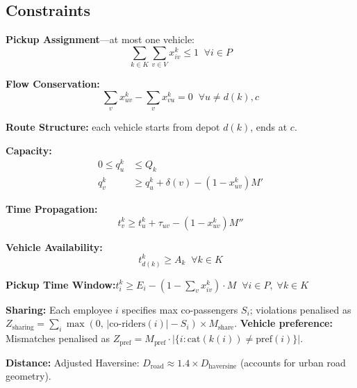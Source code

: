 \documentclass[11pt,a4paper]{article}
\begin{document}
\subsection{Constraints}

\begin{minipage}[t]{0.48\textwidth}
\textbf{Pickup Assignment}---at most one vehicle:
\begin{equation}
\sum_{k\in K}\sum_{v\in V} x_{iv}^k \le 1 \;\;\forall i \in P
\end{equation}

\textbf{Flow Conservation:}
\begin{equation}
\sum_{v} x_{uv}^k - \sum_{v} x_{vu}^k = 0 \;\;\forall u \neq d(k),c
\end{equation}

\textbf{Route Structure:} each vehicle starts from depot $d(k)$, ends at $c$.
\end{minipage}
\hfill
\begin{minipage}[t]{0.48\textwidth}
\textbf{Capacity:}
\begin{align}
0 \le q_u^k &\le Q_k \\
q_v^k &\ge q_u^k + \delta(v) - (1{-}x_{uv}^k)M'
\end{align}

\textbf{Time Propagation:}
\begin{equation}
t_v^k \ge t_u^k + \tau_{uv} - (1{-}x_{uv}^k)M''
\end{equation}

\textbf{Vehicle Availability:}
\begin{equation}
t_{d(k)}^k \ge A_k \;\;\forall k\in K
\end{equation}
\end{minipage}

\vspace{4pt}
\textbf{Pickup Time Window:}\quad $t_i^k \ge E_i - (1 - \sum_{v} x_{iv}^k) \cdot M \;\; \forall i \in P,\; \forall k \in K$

\textbf{Sharing:} Each employee $i$ specifies max co-passengers $S_i$; violations penalised as $Z_{\text{sharing}} = \sum_i \max(0,\, |\text{co-riders}(i)| - S_i) \times M_{\text{share}}$. \textbf{Vehicle preference:} Mismatches penalised as $Z_{\text{pref}} = M_{\text{pref}} \cdot |\{i : \text{cat}(k(i)) \neq \text{pref}(i)\}|$.

\textbf{Distance:} Adjusted Haversine: $D_{\text{road}} \approx 1.4 \times D_{\text{haversine}}$ (accounts for urban road geometry).

\end{document}
